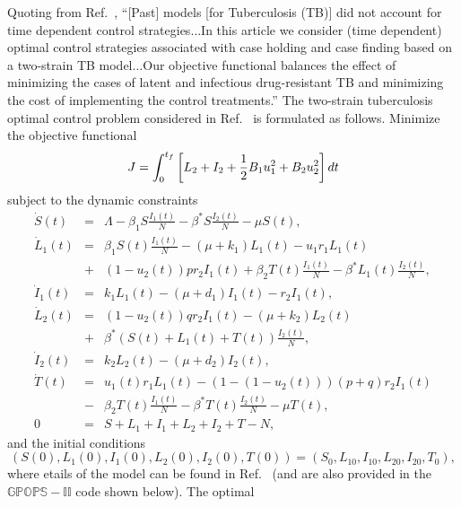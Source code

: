 \documentclass[10pt]{article}
\begin{document}
Quoting from Ref.~, ``[Past]
models [for Tuberculosis (TB)] did not account for time dependent control
strategies$\ldots$In this article we consider (time dependent) optimal
control strategies associated with case holding and case finding based
on a two-strain TB model$\ldots$Our objective functional balances the
effect of minimizing the cases of latent and infectious drug-resistant
TB and minimizing the cost of implementing the control treatments.''
The two-strain tuberculosis optimal control problem considered in 
Ref.~ is formulated as follows.  Minimize the objective
functional
\begin{equation}\label{TB-cost}
  J = \int_0^{t_f} \left[\scriptsize  L_2 + I_2 + \frac{1}{2}  B_1 u_1^2 + B_2  u_2^2\right]dt 
\end{equation}
subject to the dynamic constraints
\begin{equation}\label{TB-dynamics}
 \begin{array}{lcl}
    \dot{S}(t) & = & \Lambda - \beta_1 S\frac{I_1 (t)}{N} - \beta^*  S\frac{I_2 (t)}{N} - \mu S (t), \\
    \dot{L}_1 (t) & = &  \beta_1 S (t)\frac{I_1 (t)}{N} - (\mu + k_1)L_1 (t) - u_1  r_1L_1 (t) \\
    & + & (1-u_2 (t))p r_2 I_1 (t) +\beta_2 T (t) \frac{I_1 (t)}{N} - \beta^* L_1 (t) \frac{I_2 (t)}{N}, \\
    \dot{I}_1 (t) & = & k_1 L_1 (t) - (\mu + d_1) I_1 (t) - r_2 I_1 (t), \\
    \dot{L}_2 (t) & = &  (1-u_2 (t)) q r_2 I_1 (t) - (\mu + k_2) L_2 (t) \\
    & + & \beta^*  (S (t)+L_1 (t) + T (t))\frac{I_2 (t)}{N}, \\
    \dot{I}_2 (t) & = &  k_2 L_2 (t) - (\mu+d_2)I_2 (t), \\
    \dot{T}(t) & = &  u_1 (t) r_1 L_1 (t) - (1-(1-u_2 (t)))(p+q)r_2 I_1 (t) \\
    & - & \beta_2 T (t) \frac{I_1 (t)}{N} - \beta^* T (t) \frac{I_2 (t)}{N} - \mu T (t),\\
    0 & = & S + L_1 + I_1 + L_2 + I_2 + T - N,
  \end{array}
\end{equation}
and the initial conditions
\begin{equation}\label{TB-ICs}
  (S(0),L_1(0),I_1(0),L_2(0),I_2(0),T(0))=(S_0,L_{10},I_{10},L_{20},I_{20},T_0), 
\end{equation}
where etails of the model can be found in Ref.~ (and are
also provided in the $\mathbb{GPOPS-II}$ code shown below).  The optimal 
\end{document}
